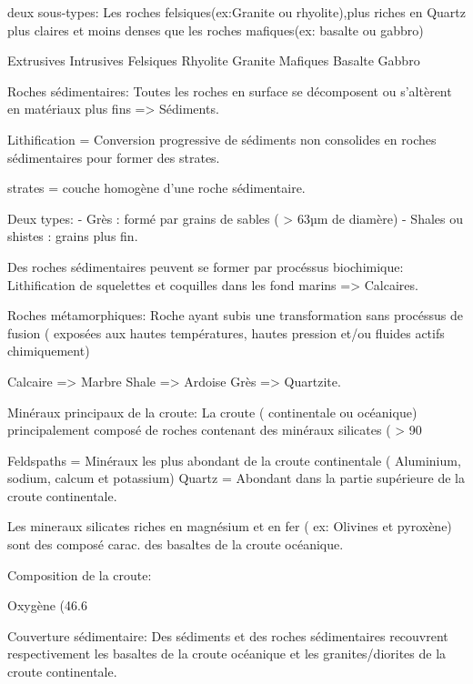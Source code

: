 deux sous-types:
Les roches felsiques(ex:Granite ou rhyolite),plus riches en Quartz plus claires et moins denses que les roches mafiques(ex: basalte ou gabbro)






	Extrusives
	Intrusives
	Felsiques
	Rhyolite
	Granite
	Mafiques
	Basalte
	Gabbro
	



Roches sédimentaires:
Toutes les roches en surface se décomposent ou s’altèrent en matériaux plus fins => Sédiments.




Lithification = Conversion progressive de sédiments non consolides en roches sédimentaires pour former des strates.


strates = couche homogène d’une roche sédimentaire.


Deux types:
- Grès : formé par grains de sables ( > 63µm  de diamère)
- Shales ou shistes : grains plus fin.


Des roches sédimentaires peuvent se former par procéssus biochimique: Lithification de squelettes et coquilles dans les fond marins => Calcaires.


Roches métamorphiques:
Roche ayant subis une transformation sans procéssus de fusion ( exposées aux hautes températures, hautes pression et/ou fluides actifs chimiquement)


Calcaire => Marbre
Shale => Ardoise
Grès => Quartzite.


Minéraux principaux de la croute:
La croute ( continentale ou océanique) principalement  composé de roches contenant des minéraux silicates ( > 90 %


Feldspaths = Minéraux les plus abondant de la croute continentale ( Aluminium, sodium, calcum et potassium)
Quartz = Abondant dans la partie supérieure de la croute continentale.


Les mineraux silicates riches en magnésium et en fer ( ex: Olivines et pyroxène) sont des composé carac. des basaltes de la croute océanique.


Composition de la croute:


Oxygène (46.6%


Couverture sédimentaire:
Des sédiments et des roches sédimentaires recouvrent respectivement les basaltes de la croute océanique et les granites/diorites de la croute continentale.


